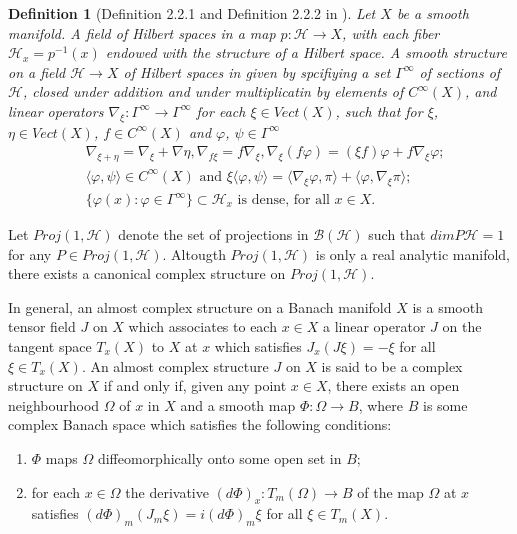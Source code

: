 \documentclass[a4paper,10pt]{amsart}
\newtheorem{definition}{Definition}[section]
\newcommand{\BBB}{\mathcal B}
\newcommand{\HHH}{\mathcal H} %
\begin{document}
\begin{definition}[Definition 2.2.1 and Definition 2.2.2 in \cite{LR}]
   Let $X$ be a smooth manifold. A field of Hilbert spaces in a map
   $p: \HHH \rightarrow X$, with each fiber $\HHH_{x} = p^{-1}(x)$
   endowed with the structure of a Hilbert space. A smooth structure on
   a field $\HHH \rightarrow X$ of Hilbert spaces in given by spcifiying
   a set $\Gamma^{\infty}$ of sections of $\HHH$, closed under
   addition and under multiplicatin by elements of $C^{\infty}(X)$,
   and linear operators $\nabla_\xi: \Gamma^{\infty} \rightarrow 
   \Gamma^{\infty}$ for each $\xi \in Vect(X)$, such that for 
   $\xi$, $\eta \in Vect(X)$, $f \in C^{\infty}(X)$ and
   $\varphi$, $\psi \in \Gamma^{\infty}$
   \begin{align}
       &\nabla_{\xi+\eta} = \nabla_{\xi} + \nabla{\eta},
       \nabla_{f\xi} = f\nabla_{\xi}, 
       \nabla_{\xi}(f\varphi)= (\xi f)\varphi + f\nabla_{\xi}\varphi;\\
       & \langle \varphi, \psi \rangle \in C^{\infty}(X) \mbox{ and }
       \xi \langle \varphi, \psi \rangle 
       = \langle \nabla_{\xi} \varphi, \pi \rangle +  
       \langle \varphi, \nabla_{\xi} \pi \rangle; \\
       & \{ \varphi(x): \varphi \in \Gamma^{\infty}\} \subset \HHH_{x} 
       \mbox{ is dense, for all } x \in X.
   \end{align}
\end{definition}

Let $Proj(1,\HHH)$ denote the set of projections in $\BBB(\HHH)$ such
that $dim P\HHH = 1$ for any $P \in Proj(1, \HHH)$.
Altougth $Proj(1, \HHH)$ is only a real analytic manifold, 
there exists a canonical complex structure on $Proj(1, \HHH)$.

In general, an almost complex structure on a Banach manifold $X$ is a 
smooth tensor field $J$ on $X$ which associates to each $x \in X$ a 
linear operator $J$ on the tangent space $T_{x}(X)$ to $X$ at $x$ 
which satisfies $J_{x}(J\xi) = -\xi$ for all $\xi \in T_{x}(X)$. 
An almost complex structure $J$ on $X$ is said to be a complex 
structure on $X$ if and only if, given any point $x \in X$, there exists
an open neighbourhood $\Omega$ of $x$ in $X$ and a smooth map
$\Phi: \Omega \rightarrow B$, where $B$ is some complex Banach
space which satisfies the following conditions:
\begin{enumerate}
    \item $\Phi$ maps $\Omega$ diffeomorphically onto some open set
        in $B$;
    \item for each $x \in \Omega$ the derivative $(d\Phi)_{x}: 
        T_{m}(\Omega) \rightarrow B$ of the map $\Omega$ at $x$
        satisfies $(d\Phi)_{m}(J_{m}\xi) = i(d\Phi)_{m}\xi$ for all
        $\xi \in T_{m}(X)$. 
\end{enumerate}
\end{document}
